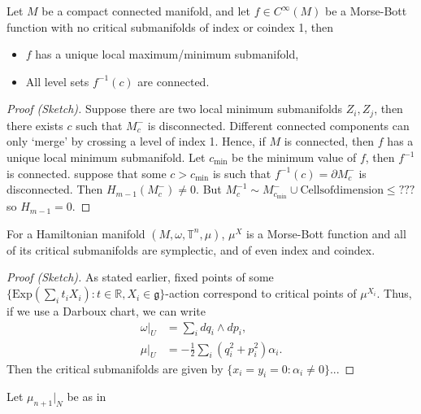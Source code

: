 \documentclass[11pt, final]{article}
\begin{document}
\begin{lemma}
	Let $ M $ be a compact connected manifold, and let $ f \in C^\infty(M) $ be a Morse-Bott function with no critical submanifolds of index or coindex 1, then
		\begin{itemize}
			\item $ f $ has a unique local maximum/minimum submanifold,
			\item All level sets $ f^{-1}(c) $ are connected.
		\end{itemize}
\end{lemma}

\begin{proof}[Proof (Sketch)]
	Suppose there are two local minimum submanifolds $ Z_i, Z_j $, then there exists $ c $ such that $ M^-_c $ is disconnected. Different connected components can only `merge' by crossing a level of index 1. Hence, if $ M $ is connected, then $ f $ has a unique local minimum submanifold. Let $ c_\mathrm{min} $ be the minimum value of $ f $, then $ f^{-1} $ is connected. suppose that some $ c > c_\mathrm{min} $ is such that $ f^{-1}(c) = \partial M^-_c $ is disconnected. Then $ H_{m-1}(M^-_c) \neq 0 $. But $ M^{-1}_c \sim M^-_{c_\mathrm{min}} \cup \mathrm{Cells of dimension } \leq ??? $ so $ H_{m-1} = 0 $.
\end{proof}

\begin{lemma}
	For a Hamiltonian manifold $ (M,\omega,\mathbb{T}^n, \mu) $, $ \mu^X $ is a Morse-Bott function and all of its critical submanifolds are symplectic, and of even index and coindex.
\end{lemma}

\begin{proof}[Proof (Sketch)]
	As stated earlier, fixed points of some $ \{\mathrm{Exp}( \sum_i t_iX_i) : t \in \mathbb{R}, X_i \in \mathfrak{g} \} $-action correspond to critical points of $ \mu^{X_i} $. Thus, if we use a Darboux chart, we can write
		\begin{align*}
			\omega|_U &= \sum_i dq_i \wedge dp_i, \\
			\mu|_U	  &= -\tfrac{1}{2} \sum_i ( q_i^2 + p_i^2) \alpha_i.
		\end{align*}
	Then the critical submanifolds are given by $ \{x_i = y_i = 0 : \alpha_i \neq 0 \} $... 
\end{proof}

\begin{lemma}
	Let $ \mu_{n+1}|_N $ be as in
\end{lemma}
\end{document}
